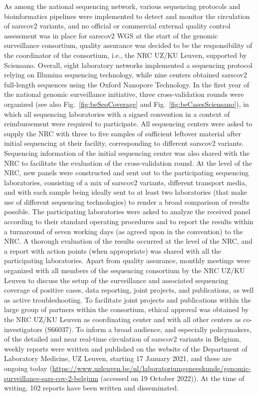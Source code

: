 As among the national sequencing network, various sequencing protocols and bioinformatics pipelines were implemented to detect and monitor the circulation of \gls{sarscov2} variants, and no official or commercial external quality control assessment was in place for \gls{sarscov2} WGS at the start of the genomic surveillance consortium, quality assurance was decided to be the responsibility of the coordinator of the consortium, i.e., the NRC UZ/KU Leuven, supported by Sciensano.
Overall, eight laboratory networks implemented a sequencing protocol relying on Illumina sequencing technology, while nine centers obtained \gls{sarscov2} full-length sequences using the Oxford Nanopore Technology.
In the first year of the national genomic surveillance initiative, three cross-validation rounds were organized (see also Fig.~\ref{fig:beSeqCoverage} and Fig.~\ref{fig:beCasesSciensano}), in which all sequencing laboratories with a signed convention in a context of reimbursement were required to participate.
All sequencing centers were asked to supply the NRC with three to five samples of sufficient leftover material after initial sequencing at their facility, corresponding to different \gls{sarscov2} variants.
Sequencing information of the initial sequencing center was also shared with the NRC to facilitate the evaluation of the cross-validation round.
At the level of the NRC, new panels were constructed and sent out to the participating sequencing laboratories, consisting of a mix of \gls{sarscov2} variants, different transport media, and with each sample being ideally sent to at least two laboratories (that make use of different sequencing technologies) to render a broad comparison of results possible.
The participating laboratories were asked to analyze the received panel according to their standard operating procedures and to report the results within a turnaround of seven working days (as agreed upon in the convention) to the NRC.
A thorough evaluation of the results occurred at the level of the NRC, and a report with action points (when appropriate) was shared with all the participating laboratories.
Apart from quality assurance, monthly meetings were organized with all members of the sequencing consortium by the NRC UZ/KU Leuven to discuss the setup of the surveillance and associated sequencing coverage of positive cases, data reporting, joint projects, and publications, as well as active troubleshooting.
To facilitate joint projects and publications within the large group of partners within the consortium, ethical approval was obtained by the NRC UZ/KU Leuven as coordinating center and with all other centers as co-investigators (S66037).
To inform a broad audience, and especially policymakers, of the detailed and near real-time circulation of \gls{sarscov2} variants in Belgium, weekly reports were written and published on the website of the Department of Laboratory Medicine, UZ Leuven, starting 17 January 2021, and these are ongoing today (\url{https://www.uzleuven.be/nl/laboratoriumgeneeskunde/genomic-surveillance-sars-cov-2-belgium} (accessed on 19 October 2022)).
At the time of writing, 102 reports have been written and disseminated.

